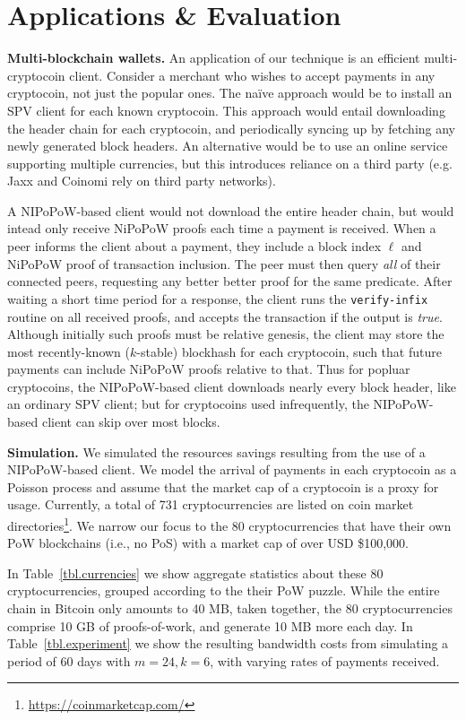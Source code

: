 \section{Applications \& Evaluation}
\label{sec.applications}

\noindent
\textbf{Multi-blockchain wallets.}
\label{sec.multichain}
An application of our technique is an efficient multi-cryptocoin client.
Consider a merchant who wishes to accept payments in any cryptocoin, not just
the popular ones. The na\"ive approach would be to install an SPV client for each known cryptocoin.
This approach would entail downloading the header chain for each cryptocoin, and
periodically syncing up by fetching any newly generated block headers. An
alternative would be to use an online service supporting multiple currencies,
but this introduces reliance on a third party (e.g. Jaxx and Coinomi rely on
third party networks).

A NIPoPoW-based client would not download the entire header chain, but would intead only receive NiPoPoW proofs each time a payment is received. When a peer informs the client about a payment, they include a block index $\ell$ and NiPoPoW proof of transaction inclusion. The peer must then query \emph{all} of their connected peers, requesting any better better proof for the same predicate. After waiting a short time period for a response, the client runs the \texttt{verify-infix} routine on all received proofs, and accepts the transaction if the output is \emph{true}. Although initially such proofs must be relative genesis, the client may store the most recently-known ($k$-stable) blockhash for each cryptocoin, such that future payments can include NiPoPoW proofs relative to that. Thus for popluar cryptocoins, the NIPoPoW-based
client downloads nearly every block header, like an ordinary SPV client; but for
cryptocoins used infrequently, the NIPoPoW-based client can skip over most
blocks.

\noindent
\textbf{Simulation.}
We simulated the resources savings resulting from the use of a NIPoPoW-based
client. We model the arrival of payments in each cryptocoin as a Poisson process
and assume that the market cap of a cryptocoin is a proxy for usage. Currently,
a total of 731 cryptocurrencies are listed on coin market
directories\footnote{\url{https://coinmarketcap.com/}}. We narrow our focus to
the 80 cryptocurrencies that have their own PoW blockchains (i.e., no PoS) with
a market cap of over USD \$100,000.

In Table~\ref{tbl.currencies} we show aggregate statistics about these 80
cryptocurrencies, grouped according to the their PoW puzzle. While the entire
chain in Bitcoin only amounts to 40 MB, taken together, the 80 cryptocurrencies
comprise 10 GB of proofs-of-work, and generate 10 MB more each day. In
Table~\ref{tbl.experiment} we show the resulting bandwidth costs from simulating
a period of 60 days with $m=24, k=6$, with varying rates of payments received.

